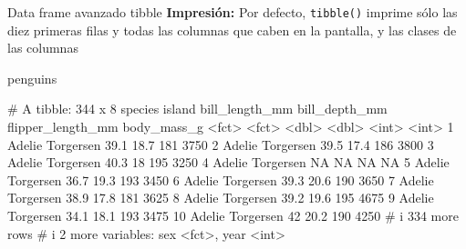 \documentclass[
  ignorenonframetext,
  aspectratio=169]{beamer}
\newenvironment{Shaded}{\begin{snugshade}}{\end{snugshade}}
\newcommand{\NormalTok}[1]{#1}
\let\oldverbatim\verbatim
\let\endoldverbatim\endverbatim
\renewenvironment{verbatim}{\tiny\oldverbatim}{\endoldverbatim}
\begin{document}
\begin{frame}[fragile]{Data frame avanzado tibble}
\label{data-frame-avanzado-tibble-5}
\textbf{Impresión:} Por defecto, \texttt{tibble()} imprime sólo las diez
primeras filas y todas las columnas que caben en la pantalla, y las
clases de las columnas

\begin{Shaded}
\begin{Highlighting}[]
\NormalTok{penguins}
\end{Highlighting}
\end{Shaded}

\begin{verbatim}
# A tibble: 344 x 8
   species island    bill_length_mm bill_depth_mm flipper_length_mm body_mass_g
   <fct>   <fct>              <dbl>         <dbl>             <int>       <int>
 1 Adelie  Torgersen           39.1          18.7               181        3750
 2 Adelie  Torgersen           39.5          17.4               186        3800
 3 Adelie  Torgersen           40.3          18                 195        3250
 4 Adelie  Torgersen           NA            NA                  NA          NA
 5 Adelie  Torgersen           36.7          19.3               193        3450
 6 Adelie  Torgersen           39.3          20.6               190        3650
 7 Adelie  Torgersen           38.9          17.8               181        3625
 8 Adelie  Torgersen           39.2          19.6               195        4675
 9 Adelie  Torgersen           34.1          18.1               193        3475
10 Adelie  Torgersen           42            20.2               190        4250
# i 334 more rows
# i 2 more variables: sex <fct>, year <int>
\end{verbatim}
\end{frame}
\end{document}
